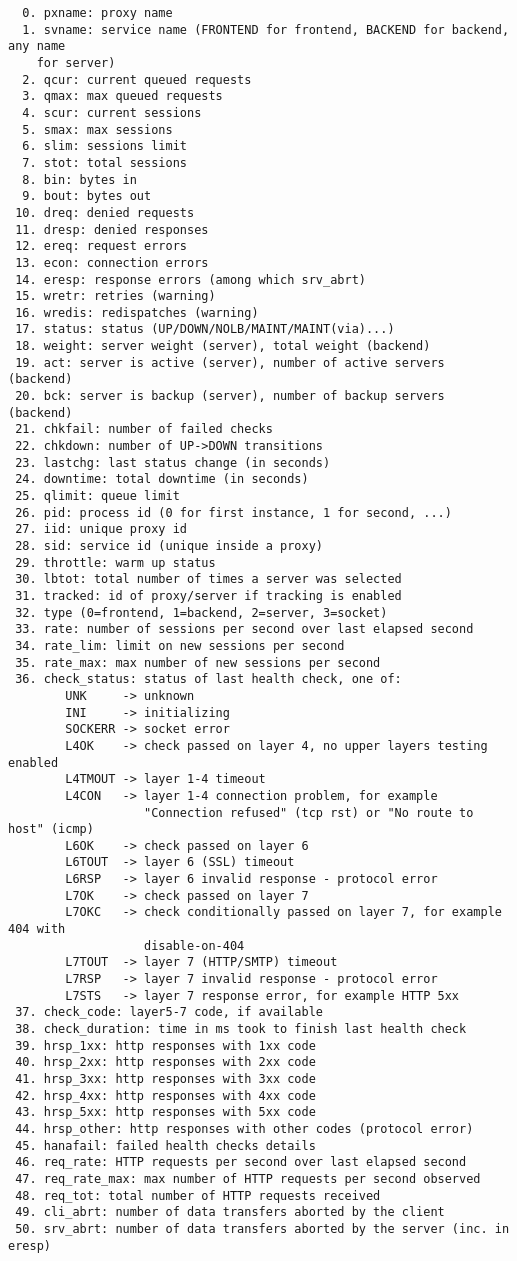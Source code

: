 \begin{verbatim}
  0. pxname: proxy name
  1. svname: service name (FRONTEND for frontend, BACKEND for backend, any name
    for server)
  2. qcur: current queued requests
  3. qmax: max queued requests
  4. scur: current sessions
  5. smax: max sessions
  6. slim: sessions limit
  7. stot: total sessions
  8. bin: bytes in
  9. bout: bytes out
 10. dreq: denied requests
 11. dresp: denied responses
 12. ereq: request errors
 13. econ: connection errors
 14. eresp: response errors (among which srv_abrt)
 15. wretr: retries (warning)
 16. wredis: redispatches (warning)
 17. status: status (UP/DOWN/NOLB/MAINT/MAINT(via)...)
 18. weight: server weight (server), total weight (backend)
 19. act: server is active (server), number of active servers (backend)
 20. bck: server is backup (server), number of backup servers (backend)
 21. chkfail: number of failed checks
 22. chkdown: number of UP->DOWN transitions
 23. lastchg: last status change (in seconds)
 24. downtime: total downtime (in seconds)
 25. qlimit: queue limit
 26. pid: process id (0 for first instance, 1 for second, ...)
 27. iid: unique proxy id
 28. sid: service id (unique inside a proxy)
 29. throttle: warm up status
 30. lbtot: total number of times a server was selected
 31. tracked: id of proxy/server if tracking is enabled
 32. type (0=frontend, 1=backend, 2=server, 3=socket)
 33. rate: number of sessions per second over last elapsed second
 34. rate_lim: limit on new sessions per second
 35. rate_max: max number of new sessions per second
 36. check_status: status of last health check, one of:
        UNK     -> unknown
        INI     -> initializing
        SOCKERR -> socket error
        L4OK    -> check passed on layer 4, no upper layers testing enabled
        L4TMOUT -> layer 1-4 timeout
        L4CON   -> layer 1-4 connection problem, for example
                   "Connection refused" (tcp rst) or "No route to host" (icmp)
        L6OK    -> check passed on layer 6
        L6TOUT  -> layer 6 (SSL) timeout
        L6RSP   -> layer 6 invalid response - protocol error
        L7OK    -> check passed on layer 7
        L7OKC   -> check conditionally passed on layer 7, for example 404 with
                   disable-on-404
        L7TOUT  -> layer 7 (HTTP/SMTP) timeout
        L7RSP   -> layer 7 invalid response - protocol error
        L7STS   -> layer 7 response error, for example HTTP 5xx
 37. check_code: layer5-7 code, if available
 38. check_duration: time in ms took to finish last health check
 39. hrsp_1xx: http responses with 1xx code
 40. hrsp_2xx: http responses with 2xx code
 41. hrsp_3xx: http responses with 3xx code
 42. hrsp_4xx: http responses with 4xx code
 43. hrsp_5xx: http responses with 5xx code
 44. hrsp_other: http responses with other codes (protocol error)
 45. hanafail: failed health checks details
 46. req_rate: HTTP requests per second over last elapsed second
 47. req_rate_max: max number of HTTP requests per second observed
 48. req_tot: total number of HTTP requests received
 49. cli_abrt: number of data transfers aborted by the client
 50. srv_abrt: number of data transfers aborted by the server (inc. in eresp)
\end{verbatim}

